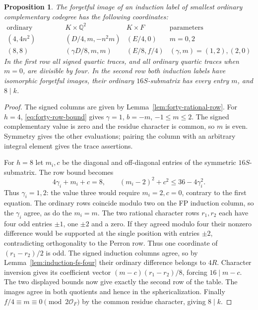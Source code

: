 \documentclass[11pt,reqno]{amsart}
\newtheorem{proposition}[theorem]{Proposition}
\theoremstyle{remark}\newtheorem{remark}[theorem]{Remark}
\numberwithin{equation}{section}
\begin{document}
\begin{proposition}\label{prop:forty-four-column}\label{prop:forty-eight-columns}
The forgetful image of an induction label of smallest ordinary
complementary codegree has the following coordinates:
\[
\begin{array}{c|c|c|l}
\text{ordinary codegrees}& K\times\mathbb Q^2 & K\times F&\text{parameters}\\\hline
(4,4n^2)&(D/4,m,-n^2m)&(E/4,0)&m=0,2\\
(8,8)&(\gamma D/8,m,m)&(E/8,f/4)&(\gamma,m)=(1,2),(2,0)
\end{array}
\]
In the first row all signed quartic traces, and all ordinary quartic
traces when $m=0$, are divisible by four. In the second row both
induction labels have isomorphic forgetful images, their ordinary
$16S$-submatrix has every entry $m$, and $8\mid k$.
\end{proposition}
\begin{proof}
The signed columns are given by Lemma~\ref{lem:forty-rational-row}.
For $h=4$, \eqref{eq:forty-row-bound} gives $\gamma=1$, $b=-m$,
$-1\le m\le2$. The signed complementary value is zero and the
residue character is common, so $m$ is even. Symmetry gives the
other evaluations; pairing the column with an arbitrary integral
element gives the trace assertions.

For $h=8$ let $m_i,c$ be the diagonal and off-diagonal entries of the
symmetric $16S$-submatrix. The row bound becomes
\[
 4\gamma_i+m_i+c=8,\qquad (m_i-2)^2+c^2\le36-4\gamma_i^2 .
\]
Thus $\gamma_i=1,2$: the value three would require $m_i=2,c=0$,
contrary to the first equation. The ordinary rows coincide modulo
two on the FP induction column, so the $\gamma_i$ agree, as do the
$m_i=m$.
The two rational character rows $r_1,r_2$ each have four odd
entries $\pm1$, one $\pm2$ and a zero. If they agreed modulo four
their nonzero difference would be supported at the single position
with entries $\pm2$, contradicting orthogonality to the Perron row.
Thus one coordinate of $(r_1-r_2)/2$ is odd. The signed induction
columns agree, so by Lemma~\ref{lem:induction-fs-four} their ordinary
difference belongs to $4R$. Character inversion gives its coefficient
vector $(m-c)(r_1-r_2)/8$, forcing $16\mid m-c$. The two displayed
bounds now give exactly the second row of the table. The images
agree in both quotients and hence in the sphericalization.
Finally $f/4\equiv m\equiv0\pmod{2\mathcal O_F}$ by the common
residue character, giving $8\mid k$.
\end{proof}
\end{document}
